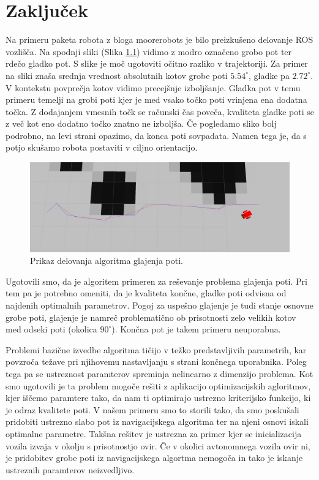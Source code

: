 \chapter{Zaključek}\label{cha:diskusija}

Na primeru paketa robota z bloga moorerobots \cite{vir10} je bilo preizkušeno delovanje ROS vozlišča. Na spodnji sliki (Slika \ref{fig:slika7}) vidimo z modro označeno grobo pot ter rdečo gladko pot. S slike je moč ugotoviti očitno razliko v trajektoriji. Za primer na sliki znaša srednja vrednost absolutnih kotov grobe poti $5.54^{\circ} $, gladke pa $2.72^{\circ}$. V kontekstu povprečja kotov vidimo precejšnje izboljšanje. Gladka pot v temu primeru temelji na grobi poti kjer je med vsako točko poti vrinjena ena dodatna točka. Z dodajanjem vmesnih točk se računski čas poveča, kvaliteta gladke poti se z več kot eno dodatno točko znatno ne izboljša. Če pogledamo sliko bolj podrobno, na levi strani opazimo, da konca poti sovpadata. Namen tega je, da s potjo skušamo robota postaviti v ciljno orientacijo.

\begin{figure}[H]
	\centering
	\includegraphics[width=16cm]{pic/preizkus_k.png}
	\caption{Prikaz delovanja algoritma glajenja poti.}
	\label{fig:slika7}
\end{figure}

Ugotovili smo, da je algoritem primeren za reševanje problema glajenja poti. Pri tem pa je potrebno omeniti, da je kvaliteta končne, gladke poti odvisna od najdenih optimalnih parametrov. Pogoj za uspešno glajenje je tudi stanje osnovne grobe poti, glajenje je namreč problematično ob prisotnosti zelo velikih kotov med odseki poti (okolica $90^{\circ}$). Končna pot je takem primeru neuporabna.

Problemi bazične izvedbe algoritma tičijo v težko predstavljivih parametrih, kar povzroča težave pri njihovemu nastavljanju s strani končnega uporabnika. Poleg tega pa se ustreznost paramterov spreminja nelinearno z dimenzijo problema. Kot smo ugotovili je ta problem mogoče rešiti z aplikacijo optimizacijskih agloritmov, kjer iščemo paramtere tako, da nam ti optimirajo ustrezno kriterijsko funkcijo, ki je odraz kvalitete poti. V našem primeru smo to storili tako, da smo poskušali pridobiti ustrezno slabo pot iz navigacijskega algoritma ter na njeni osnovi iskali optimalne parametre. Takšna rešitev je ustrezna za primer kjer se inicializacija vozila izvaja v okolju s prisotnostjo ovir. Če  v okolici avtonomnega vozila ovir ni, je pridobitev grobe poti iz navigacijskega algortma nemogoča in tako je iskanje ustreznih paramterov neizvedljivo.

